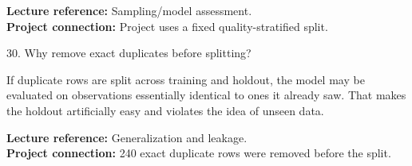 \documentclass[10.5pt,a4paper]{article}
\newcommand{\chapref}[1]{\textbf{Lecture reference:} #1}
\newcommand{\projectref}[1]{\textbf{Project connection:} #1}
\begin{document}
\begin{refbox}\chapref{Sampling/model assessment.}\\\projectref{Project uses a fixed quality-stratified split.}\end{refbox}
\begin{qbox}{30. Why remove exact duplicates before splitting?}
\end{qbox}
\begin{answerbox}If duplicate rows are split across training and holdout, the model may be evaluated on observations essentially identical to ones it already saw. That makes the holdout artificially easy and violates the idea of unseen data.\end{answerbox}
\begin{refbox}\chapref{Generalization and leakage.}\\\projectref{240 exact duplicate rows were removed before the split.}\end{refbox}
\end{document}
